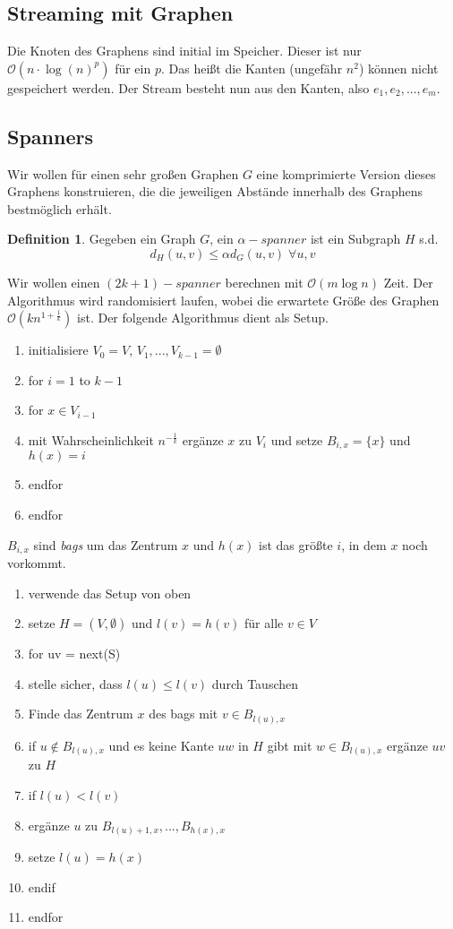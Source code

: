 \documentclass[a4paper, 12pt]{article}
\theoremstyle{plain}
\theoremstyle{definition}
\newtheorem{definition}[theorem]{Definition} %
\theoremstyle{lemma}
\theoremstyle{remark}
\theoremstyle{corollary}
\theoremstyle{example}
\begin{document}
	\subsection{Streaming mit Graphen}
	Die Knoten des Graphens sind initial im Speicher. Dieser ist nur $\mathcal{O}(n\cdot \log(n)^p)$ für ein $p$. Das heißt die Kanten (ungefähr $n^2$) können nicht gespeichert werden. Der Stream besteht nun aus den Kanten, also $e_1,e_2,...,e_m$.
	\subsection{Spanners}
	Wir wollen für einen sehr großen Graphen $G$ eine komprimierte Version dieses Graphens konstruieren, die die jeweiligen Abstände innerhalb des Graphens bestmöglich erhält.
	\begin{definition}
		Gegeben ein Graph $G$, ein $\alpha-spanner$ ist ein Subgraph $H$ s.d. \[d_H(u,v) \leq \alpha d_G(u,v) \; \forall u,v\]
	\end{definition}
	Wir wollen einen $(2k+1)-spanner$ berechnen mit $\mathcal{O}(m \log n)$ Zeit. Der Algorithmus wird randomisiert laufen, wobei die erwartete Größe des Graphen $\mathcal{O}(kn^{1+\frac{1}{k}})$ ist. Der folgende Algorithmus dient als Setup.\\
	\begin{enumerate}
		\item initialisiere $V_0 = V$, $V_1,...,V_{k-1} = \emptyset$
		\item for $i=1$ to $k-1$
		\item for $x \in V_{i-1}$
		\item mit Wahrscheinlichkeit $n^{-\frac{1}{k}}$ ergänze $x$ zu $V_i$ und setze $B_{i,x} = \{x\}$ und $h(x) = i$
		\item endfor
		\item endfor
	\end{enumerate}
	$B_{i,x}$ sind \textit{bags} um das Zentrum $x$ und $h(x)$ ist das größte $i$, in dem $x$ noch vorkommt.
	\begin{enumerate}
		\item verwende das Setup von oben
		\item setze $H = (V,\emptyset)$ und $l(v) = h(v)$ für alle $v \in V$
		\item for uv = next(S)
		\item stelle sicher, dass $l(u) \leq l(v)$ durch Tauschen
		\item Finde das Zentrum $x$ des bags mit $v \in B_{l(u),x}$
		\item if $u \notin B_{l(u),x}$ und es keine Kante $uw$ in $H$ gibt mit $w \in B_{l(u),x}$ ergänze $uv$ zu $H$
		\item if $l(u) < l(v)$
		\item ergänze $u$ zu $B_{l(u)+1,x},...,B_{h(x),x}$
		\item setze $l(u) = h(x)$
		\item endif
		\item endfor
	\end{enumerate}
\end{document}
